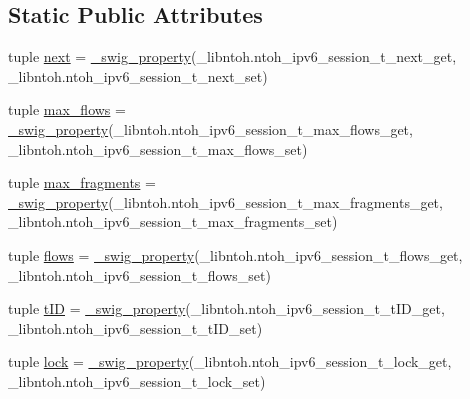 \subsection*{Static Public Attributes}
\begin{DoxyCompactItemize}
\item 
tuple \hyperlink{classlibntoh_1_1ntoh__ipv6__session__t_a84e6dac37062f5a539ece8248c8567cc}{next} = \hyperlink{namespacelibntoh_ae6f5626f776538e0cdb00e75ca1c96c9}{\-\_\-swig\-\_\-property}(\-\_\-libntoh.\-ntoh\-\_\-ipv6\-\_\-session\-\_\-t\-\_\-next\-\_\-get, \-\_\-libntoh.\-ntoh\-\_\-ipv6\-\_\-session\-\_\-t\-\_\-next\-\_\-set)
\item 
tuple \hyperlink{classlibntoh_1_1ntoh__ipv6__session__t_af05028fd588ff1bc962a8a89057a3716}{max\-\_\-flows} = \hyperlink{namespacelibntoh_ae6f5626f776538e0cdb00e75ca1c96c9}{\-\_\-swig\-\_\-property}(\-\_\-libntoh.\-ntoh\-\_\-ipv6\-\_\-session\-\_\-t\-\_\-max\-\_\-flows\-\_\-get, \-\_\-libntoh.\-ntoh\-\_\-ipv6\-\_\-session\-\_\-t\-\_\-max\-\_\-flows\-\_\-set)
\item 
tuple \hyperlink{classlibntoh_1_1ntoh__ipv6__session__t_aae26317f4443b9f0f36780fb035d1ec9}{max\-\_\-fragments} = \hyperlink{namespacelibntoh_ae6f5626f776538e0cdb00e75ca1c96c9}{\-\_\-swig\-\_\-property}(\-\_\-libntoh.\-ntoh\-\_\-ipv6\-\_\-session\-\_\-t\-\_\-max\-\_\-fragments\-\_\-get, \-\_\-libntoh.\-ntoh\-\_\-ipv6\-\_\-session\-\_\-t\-\_\-max\-\_\-fragments\-\_\-set)
\item 
tuple \hyperlink{classlibntoh_1_1ntoh__ipv6__session__t_afca3cb4196e6410df799227741f11b5e}{flows} = \hyperlink{namespacelibntoh_ae6f5626f776538e0cdb00e75ca1c96c9}{\-\_\-swig\-\_\-property}(\-\_\-libntoh.\-ntoh\-\_\-ipv6\-\_\-session\-\_\-t\-\_\-flows\-\_\-get, \-\_\-libntoh.\-ntoh\-\_\-ipv6\-\_\-session\-\_\-t\-\_\-flows\-\_\-set)
\item 
tuple \hyperlink{classlibntoh_1_1ntoh__ipv6__session__t_aa8af5c32a2a96a7fe7e14b7ebd2057ba}{t\-I\-D} = \hyperlink{namespacelibntoh_ae6f5626f776538e0cdb00e75ca1c96c9}{\-\_\-swig\-\_\-property}(\-\_\-libntoh.\-ntoh\-\_\-ipv6\-\_\-session\-\_\-t\-\_\-t\-I\-D\-\_\-get, \-\_\-libntoh.\-ntoh\-\_\-ipv6\-\_\-session\-\_\-t\-\_\-t\-I\-D\-\_\-set)
\item 
tuple \hyperlink{classlibntoh_1_1ntoh__ipv6__session__t_a871c7bf899334194698c2a3bced5e064}{lock} = \hyperlink{namespacelibntoh_ae6f5626f776538e0cdb00e75ca1c96c9}{\-\_\-swig\-\_\-property}(\-\_\-libntoh.\-ntoh\-\_\-ipv6\-\_\-session\-\_\-t\-\_\-lock\-\_\-get, \-\_\-libntoh.\-ntoh\-\_\-ipv6\-\_\-session\-\_\-t\-\_\-lock\-\_\-set)
\end{DoxyCompactItemize}


